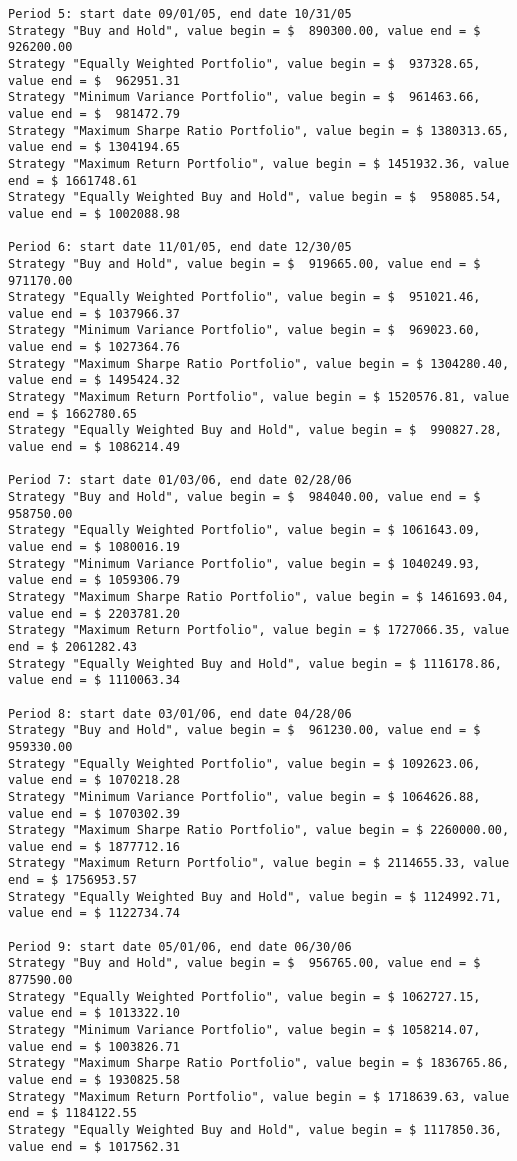 \documentclass[english]{scrartcl}
\begin{document}
\begin{verbatim}
Period 5: start date 09/01/05, end date 10/31/05
Strategy "Buy and Hold", value begin = $  890300.00, value end = $  926200.00
Strategy "Equally Weighted Portfolio", value begin = $  937328.65, value end = $  962951.31
Strategy "Minimum Variance Portfolio", value begin = $  961463.66, value end = $  981472.79
Strategy "Maximum Sharpe Ratio Portfolio", value begin = $ 1380313.65, value end = $ 1304194.65
Strategy "Maximum Return Portfolio", value begin = $ 1451932.36, value end = $ 1661748.61
Strategy "Equally Weighted Buy and Hold", value begin = $  958085.54, value end = $ 1002088.98

Period 6: start date 11/01/05, end date 12/30/05
Strategy "Buy and Hold", value begin = $  919665.00, value end = $  971170.00
Strategy "Equally Weighted Portfolio", value begin = $  951021.46, value end = $ 1037966.37
Strategy "Minimum Variance Portfolio", value begin = $  969023.60, value end = $ 1027364.76
Strategy "Maximum Sharpe Ratio Portfolio", value begin = $ 1304280.40, value end = $ 1495424.32
Strategy "Maximum Return Portfolio", value begin = $ 1520576.81, value end = $ 1662780.65
Strategy "Equally Weighted Buy and Hold", value begin = $  990827.28, value end = $ 1086214.49

Period 7: start date 01/03/06, end date 02/28/06
Strategy "Buy and Hold", value begin = $  984040.00, value end = $  958750.00
Strategy "Equally Weighted Portfolio", value begin = $ 1061643.09, value end = $ 1080016.19
Strategy "Minimum Variance Portfolio", value begin = $ 1040249.93, value end = $ 1059306.79
Strategy "Maximum Sharpe Ratio Portfolio", value begin = $ 1461693.04, value end = $ 2203781.20
Strategy "Maximum Return Portfolio", value begin = $ 1727066.35, value end = $ 2061282.43
Strategy "Equally Weighted Buy and Hold", value begin = $ 1116178.86, value end = $ 1110063.34

Period 8: start date 03/01/06, end date 04/28/06
Strategy "Buy and Hold", value begin = $  961230.00, value end = $  959330.00
Strategy "Equally Weighted Portfolio", value begin = $ 1092623.06, value end = $ 1070218.28
Strategy "Minimum Variance Portfolio", value begin = $ 1064626.88, value end = $ 1070302.39
Strategy "Maximum Sharpe Ratio Portfolio", value begin = $ 2260000.00, value end = $ 1877712.16
Strategy "Maximum Return Portfolio", value begin = $ 2114655.33, value end = $ 1756953.57
Strategy "Equally Weighted Buy and Hold", value begin = $ 1124992.71, value end = $ 1122734.74

Period 9: start date 05/01/06, end date 06/30/06
Strategy "Buy and Hold", value begin = $  956765.00, value end = $  877590.00
Strategy "Equally Weighted Portfolio", value begin = $ 1062727.15, value end = $ 1013322.10
Strategy "Minimum Variance Portfolio", value begin = $ 1058214.07, value end = $ 1003826.71
Strategy "Maximum Sharpe Ratio Portfolio", value begin = $ 1836765.86, value end = $ 1930825.58
Strategy "Maximum Return Portfolio", value begin = $ 1718639.63, value end = $ 1184122.55
Strategy "Equally Weighted Buy and Hold", value begin = $ 1117850.36, value end = $ 1017562.31


\end{verbatim}
\end{document}
